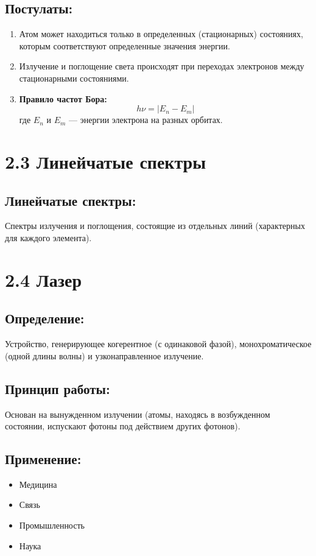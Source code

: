\documentclass[a4paper,12pt]{article}
\begin{document}
\subsection*{Постулаты:}
\vspace{-3pt}
\begin{enumerate}[itemsep=0pt, topsep=0pt, parsep=3pt]
    \item Атом может находиться только в определенных (стационарных) состояниях, которым соответствуют определенные значения энергии.
    \item Излучение и поглощение света происходят при переходах электронов между стационарными состояниями.
    \item \textbf{Правило частот Бора:}
    \vspace{-0.05em}
    $$ h\nu = |E_n - E_m| $$
    где $E_n$ и $E_m$ — энергии электрона на разных орбитах.
\end{enumerate}


\section*{2.3 Линейчатые спектры}
\vspace{-9pt}
\subsection*{Линейчатые спектры:}
\vspace{-3pt}
Спектры излучения и поглощения, состоящие из отдельных линий (характерных для каждого элемента).

\section*{2.4 Лазер}
\vspace{-9pt}
\subsection*{Определение:}
\vspace{-3pt}
Устройство, генерирующее когерентное (с одинаковой фазой), монохроматическое (одной длины волны) и узконаправленное излучение.

\vspace{-9pt}
\subsection*{Принцип работы:}
\vspace{-3pt}
Основан на вынужденном излучении (атомы, находясь в возбужденном состоянии, испускают фотоны под действием других фотонов).

\vspace{-9pt}
\subsection*{Применение:}
\vspace{-3pt}
\begin{itemize}[itemsep=0pt, topsep=0pt, parsep=3pt]
    \item Медицина
    \item Связь
    \item Промышленность
    \item Наука
\end{itemize}
\end{document}
